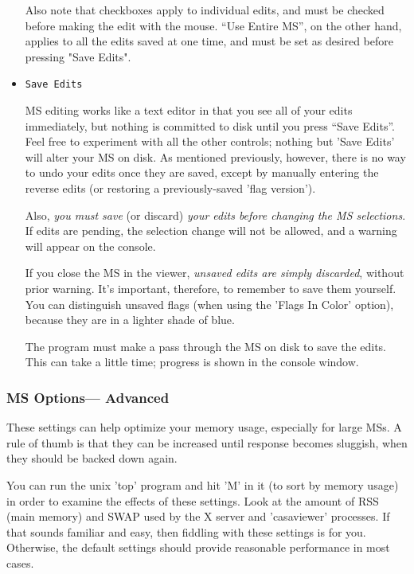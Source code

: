 \begin{itemize}
Also note that checkboxes apply to individual edits, and must be checked
before making the edit with the mouse.  ``Use Entire MS'', on the other hand,
applies to all the edits saved at one time, and must be set as desired
before pressing "Save Edits".

\item {\tt Save Edits}

MS editing works like a text editor in that
you see all of your edits immediately, but nothing is committed to disk
until you press ``Save Edits''.  Feel free to experiment with all the other
controls; nothing but 'Save Edits' will alter your MS on disk. 
As mentioned previously, however, there is no way to undo your edits once
they are saved, except by manually entering the reverse edits (or restoring
a previously-saved 'flag version').

Also, {\it you must save} (or discard) {\it your edits before changing the 
MS selections}.  If edits are pending, the selection change will not be 
allowed, and a warning will appear on the console.  

If you close the MS in the viewer, {\it unsaved edits are simply discarded},
without prior warning.  It's important, therefore, to remember to save them
yourself.  You can distinguish unsaved flags (when using the 'Flags In Color'
option), because they are in a lighter shade of blue.

The program must make a pass through the MS on disk to save the edits.
This can take a little time; progress is shown in the console window.

\end{itemize}

\subsubsection{MS Options---  Advanced}
\label{section:display.ms.adjust.adv}

These settings can help optimize your memory usage, especially for
large MSs.  A rule of thumb is that they can be increased until response
becomes sluggish, when they should be backed down again.

You can run the unix 'top' program and hit 'M' in it (to sort by memory
usage) in order to examine the effects of these settings.  Look at the
amount of RSS (main memory) and SWAP used by the X server and 'casaviewer'
processes.  If that sounds familiar and easy, then fiddling with these
settings is for you.  Otherwise, the default settings should provide
reasonable performance in most cases.

